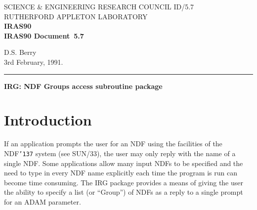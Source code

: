 \pagestyle{myheadings}

\newcommand{\irasdoccategory}  {IRAS90 Document}
\newcommand{\irasdocinitials}  {ID}
\newcommand{\irasdocnumber}    {5.7}
\newcommand{\irasdocauthors}   {D.S. Berry}
\newcommand{\irasdocdate}      {3rd February, 1991.}
\newcommand{\irasdoctitle}     {IRG: NDF Groups access subroutine package}

\newcommand{\irasdocname}{\irasdocinitials /\irasdocnumber}
\renewcommand{\_}{{\tt\char'137}}     %
\markright{\irasdocname}
\setlength{\textwidth}{160mm}
\setlength{\textheight}{240mm}
\setlength{\topmargin}{-5mm}
\setlength{\oddsidemargin}{0mm}
\setlength{\evensidemargin}{0mm}
\setlength{\parindent}{0mm}
\setlength{\parskip}{\medskipamount}
\setlength{\unitlength}{1mm}



\thispagestyle{empty}
SCIENCE \& ENGINEERING RESEARCH COUNCIL \hfill \irasdocname\\
RUTHERFORD APPLETON LABORATORY\\
{\large\bf IRAS90\\}
{\large\bf \irasdoccategory\ \irasdocnumber}
\begin{flushright}
\irasdocauthors\\
\irasdocdate
\end{flushright}
\vspace{-4mm}
\rule{\textwidth}{0.5mm}
\vspace{5mm}
\begin{center}
{\Large\bf \irasdoctitle}
\end{center}
\vspace{5mm}

\setlength{\parskip}{0mm}
\tableofcontents
\setlength{\parskip}{\medskipamount}
\markright{\irasdocname}

\section {Introduction}

If an application prompts the user for an NDF using the facilities of the NDF\_ 
system (see SUN/33), the user may only reply with the name of a single NDF. Some
applications allow many input NDFs to be specified and the need to
type in every NDF name explicitly each time the program is run can become time
consuming. The IRG package provides a means of giving the user the
ability to specify a list (or ``Group'') of NDFs as a reply to a single prompt
for an ADAM parameter. 

